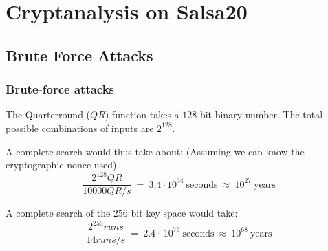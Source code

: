\section{Cryptanalysis on Salsa20}
\subsection{Brute Force Attacks}
\begin{frame}
\frametitle{Brute-force attacks}
The Quarterround ($QR$) function takes a $128$ bit binary number. The total possible combinations of inputs are $2^{128}$.

\begin{alertblock}{}
    A complete search would thus take about: \small{(Assuming we can know the cryptographic nonce used)}
    $$\dfrac{2^{128} QR}{10000 QR/s} \ = \ 3.4 \cdot 10^{34} \ \text{seconds} \ \approx \ 10^{27} \ \text{years}$$
\end{alertblock}

\begin{alertblock}{}
    A complete search of the $256$ bit key space would take:
   $$\dfrac{2^{256} runs}{14 runs/s} \ = \  2.4 \cdot \ 10^{76} \ \text{seconds} \ \approx \ 10^{68} \ \text{years}$$
\end{alertblock}
\end{frame}